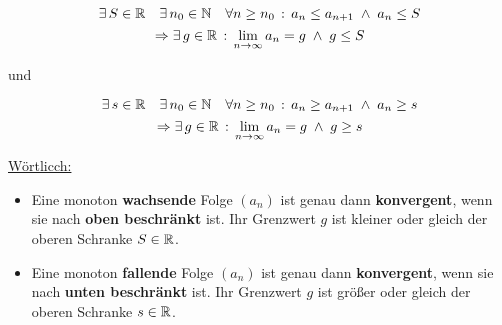 \begin{Theorem}
$$\exists\, S\in\mathbb{R} \quad \exists \,n_0\in\mathbb{N} \quad \forall n\geq n_0\,:\, a_n\leq a_{n+1}\; \land \; a_n\leq S$$
$$\Rightarrow \exists\, g\in\mathbb{R} \,:\, \lim\limits_{n\to\infty}a_n=g\;\land\; g\leq S $$
 \begin{center}und\end{center}
$$\exists \, s\in\mathbb{R} \quad\exists \, n_0\in\mathbb{N} \quad \forall n\geq n_0\,:\, a_n\geq a_{n+1}\; \land \;a_n\geq s$$
$$\Rightarrow \exists \, g\in\mathbb{R} \,:\, \lim\limits_{n\to\infty}a_n=g\;\land\; g\geq s$$
\end{Theorem}

	\underline{Wörtlicch:}
\begin{itemize}
\item Eine monoton \textbf{wachsende} Folge $(a_n)$ ist genau dann \textbf{konvergent}, wenn sie nach \textbf{oben beschränkt} ist. Ihr Grenzwert $g$ ist kleiner oder gleich der oberen Schranke $S\in\mathbb{R}$.
\item  Eine monoton \textbf{fallende} Folge $(a_n)$ ist genau dann \textbf{konvergent}, wenn sie nach \textbf{unten beschränkt} ist. Ihr Grenzwert $g$ ist größer oder gleich der oberen Schranke $s\in\mathbb{R}$.
\end{itemize}


